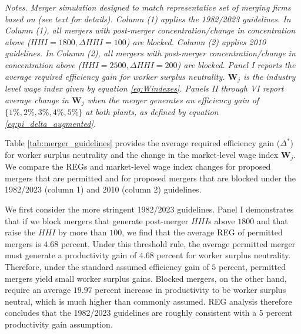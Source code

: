 \documentclass[12pt]{article}
\theoremstyle{prop}
\begin{document}
\begin{table}[p!]
\centering
 
\caption{Required efficiency gains and market wages applying 1982/2023 and 2010 guidelines. \label{tab:merger_guidelines}}
\begin{footnotesize}
\begin{flushleft}
 \textit{Notes. Merger simulation designed to match representative set of merging firms based on \citet{Arnold} (see text for details). Column (1) applies the 1982/2023 guidelines.  In Column (1), all mergers with post-merger concentration/change in concentration above ($HHI=1800, \Delta HHI=100$) are blocked. Column (2)  applies 2010 guidelines.   In Column (2), all mergers with post-merger concentration/change in concentration above ($HHI=2500, \Delta HHI=200$) are blocked. Panel I  reports the average required efficiency gain for worker surplus neutrality. $\mathbf{W}_j$ is the industry level wage index given by equation \eqref{eq:Windexes}. Panels II through VI report average change in $\mathbf{W}_j$  when the merger generates an efficiency gain of $\{1\%,2\%,3\%,4\%,5\%\}$  at both plants, as defined by equation \eqref{eq:pi_delta_augmented}.  }   
 \end{flushleft}
\end{footnotesize}
\end{table}

\noindent Table \ref{tab:merger_guidelines} provides the average required efficiency gain ($\Delta^*$) for worker surplus neutrality and the change in the market-level wage index $\mathbf{W}_j$. 
We compare the REGs and market-level wage index changes for proposed mergers that are permitted and for proposed mergers that are blocked under the 1982/2023 (column 1) and 2010 (column 2) guidelines. 

We first consider the more stringent 1982/2023 guidelines. 
Panel I demonstrates that if we block mergers that generate post-merger $HHI$s above $1800$ and that raise the $HHI$ by more than $100$, we find that the average REG of permitted mergers is $4.68$ percent. 
Under this threshold rule, the average permitted merger must generate a productivity gain of $4.68$ percent for worker surplus neutrality. 
Therefore, under the standard assumed efficiency gain of $5$ percent, permitted mergers yield small worker surplus gains. 
Blocked mergers, on the other hand, require an average $19.97$ percent increase in productivity to be worker surplus neutral, which is much higher than commonly assumed. 
REG analysis therefore concludes that the 1982/2023 guidelines are roughly consistent with a 5 percent productivity gain assumption. 
\end{document}
